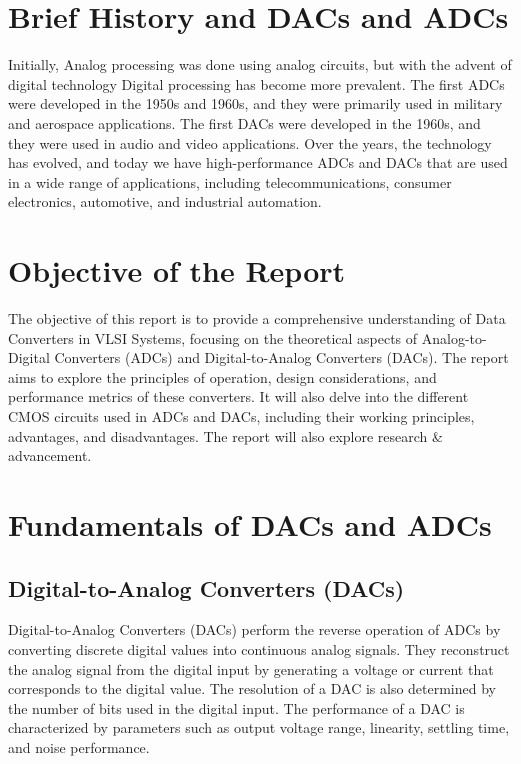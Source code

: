 \section{Brief History and DACs and ADCs}
Initially, Analog processing was done using analog circuits, but with the advent of digital technology Digital processing has become more prevalent. The first ADCs were developed in the 1950s and 1960s, and they were primarily used in military and aerospace applications. The first DACs were developed in the 1960s, and they were used in audio and video applications. Over the years, the technology has evolved, and today we have high-performance ADCs and DACs that are used in a wide range of applications, including telecommunications, consumer electronics, automotive, and industrial automation.

\section{Objective of the Report}
The objective of this report is to provide a comprehensive understanding of Data Converters in VLSI Systems, focusing on the theoretical aspects of Analog-to-Digital Converters (ADCs) and Digital-to-Analog Converters (DACs). The report aims to explore the principles of operation, design considerations, and performance metrics of these converters. It will also delve into the different CMOS circuits used in ADCs and DACs, including their working principles, advantages, and disadvantages. The report will
also explore research \& advancement.


\section{Fundamentals of DACs and ADCs}
\subsection{Digital-to-Analog Converters (DACs)}
Digital-to-Analog Converters (DACs) perform the reverse operation of ADCs by converting discrete digital values into continuous analog signals. They reconstruct the analog signal from the digital input by generating a voltage or current that corresponds to the digital value. The resolution of a DAC is also determined by the number of bits used in the digital input. The performance of a DAC is characterized by parameters such as output voltage range, linearity, settling time, and noise performance.

